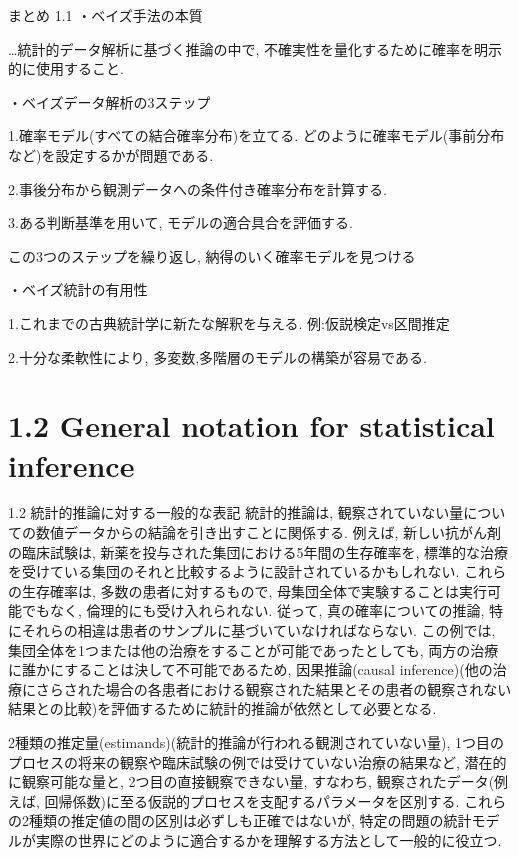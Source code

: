 \documentclass[10pt,dvipdfmx,a4]{beamer}
\begin{document}

\begin{frame}{まとめ 1.1}
・ベイズ手法の本質

…統計的データ解析に基づく推論の中で, 不確実性を量化するために確率を明示的に使用すること.

・ベイズデータ解析の3ステップ

1.確率モデル(すべての結合確率分布)を立てる.
どのように確率モデル(事前分布など)を設定するかが問題である.

2.事後分布から観測データへの条件付き確率分布を計算する.

3.ある判断基準を用いて, モデルの適合具合を評価する.

この3つのステップを繰り返し, 納得のいく確率モデルを見つける

・ベイズ統計の有用性

1.これまでの古典統計学に新たな解釈を与える. 例:仮説検定vs区間推定

2.十分な柔軟性により, 多変数,多階層のモデルの構築が容易である.
\end{frame}

\section{1.2 General notation for statistical inference}
\begin{frame}{1.2 統計的推論に対する一般的な表記}
統計的推論は, 観察されていない量についての数値データからの結論を引き出すことに関係する.
例えば, 新しい抗がん剤の臨床試験は, 新薬を投与された集団における5年間の生存確率を, 標準的な治療を受けている集団のそれと比較するように設計されているかもしれない.
これらの生存確率は, 多数の患者に対するもので, 母集団全体で実験することは実行可能でもなく, 倫理的にも受け入れられない.
従って, 真の確率についての推論, 特にそれらの相違は患者のサンプルに基づいていなければならない.
この例では, 集団全体を1つまたは他の治療をすることが可能であったとしても, 両方の治療に誰かにすることは決して不可能であるため, 因果推論(causal inference)(他の治療にさらされた場合の各患者における観察された結果とその患者の観察されない結果との比較)を評価するために統計的推論が依然として必要となる.
\end{frame}


\begin{frame}
2種類の推定量(estimands)(統計的推論が行われる観測されていない量), 1つ目のプロセスの将来の観察や臨床試験の例では受けていない治療の結果など, 潜在的に観察可能な量と, 2つ目の直接観察できない量, すなわち, 観察されたデータ(例えば, 回帰係数)に至る仮説的プロセスを支配するパラメータを区別する.
これらの2種類の推定値の間の区別は必ずしも正確ではないが, 特定の問題の統計モデルが実際の世界にどのように適合するかを理解する方法として一般的に役立つ.
\end{frame}
\end{document}
